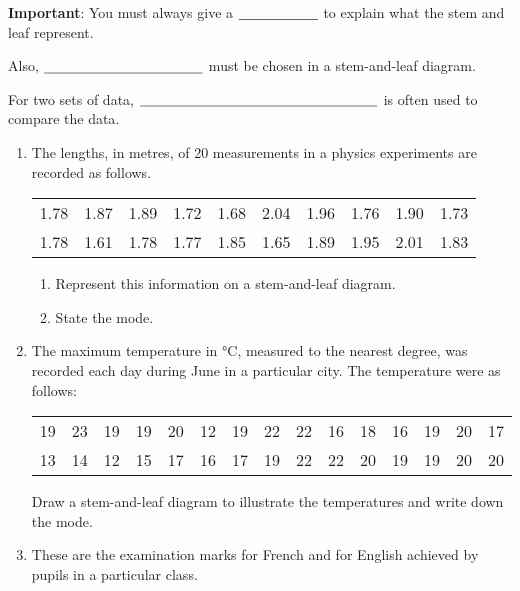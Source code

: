 \textbf{Important}: You must always give a $\underline{\hspace{2 cm}}$ to explain what the stem and leaf  represent.
\medskip

 Also, $\underline{\hspace{4 cm}}$ must be chosen in a stem-and-leaf diagram.

\bigskip

For two sets of data, $\underline{\hspace{6 cm}}$ is often used to compare the data.


\exercise %

\begin{enumerate} %
	\item  The lengths, in metres, of 20 measurements in a physics experiments are recorded as follows.
	\vspace{5 pt}
	
	\begin{tabular}{cccccccccc}
		\rule[-1ex]{0pt}{2.5ex} 1.78 & 1.87 & 1.89 & 1.72 & 1.68 & 2.04 & 1.96 & 1.76 & 1.90 & 1.73 \\
		\rule[-1ex]{0pt}{2.5ex} 1.78 & 1.61 & 1.78 & 1.77 & 1.85 & 1.65 & 1.89 & 1.95 & 2.01 & 1.83 \\
	\end{tabular}
\begin{enumerate}
	\item Represent this information on a stem-and-leaf diagram.
	\item State the mode.
\end{enumerate}
 


\item The maximum temperature in $\si{\celsius}$, measured to the nearest degree, was recorded each day during June in a particular city. The temperature were as follows:

\begin{tabular}{ccccccccccccccc}
	\rule[-1ex]{0pt}{2.5ex} 19 & 23 & 19 & 19 & 20 & 12 & 19 & 22 & 22 & 16 & 18 & 16 & 19 & 20 & 17 \\
	\rule[-1ex]{0pt}{2.5ex} 13 & 14 & 12 & 15 & 17 & 16 & 17 & 19 & 22 & 22 & 20 & 19 & 19 & 20 & 20 \\
\end{tabular}

Draw a stem-and-leaf diagram to illustrate the temperatures and write down the mode.


\item These are the examination marks for French and for English achieved by pupils in a particular class.


\end{enumerate}
